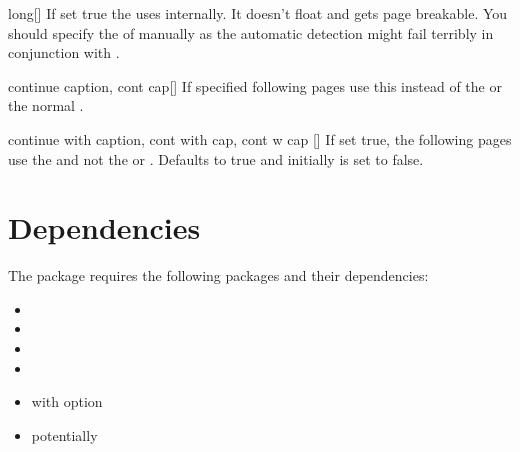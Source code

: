 \begin{describeopt}{long}[]%
  If set true the  uses  internally. It doesn't
  float and gets page breakable. You should specify the  of
   manually as the automatic detection might fail terribly in
  conjunction with .
\end{describeopt}%
\begin{describeopt}{continue caption, cont cap}[]%
  If specified following pages use this  instead of the  or the normal .
\end{describeopt}%
\begin{describeopt}{continue with caption, cont with cap, cont w cap}%
  []
  If set true, the following pages use the  and not the  or . Defaults to true and initially is set to
  false.
\end{describeopt}%

\section{Dependencies}%
The package requires the following packages and their dependencies:
\vspace*{-\multicolsep}%
\begin{multicols}{3}
  \begin{itemize}
    \item {}
    \item {}
    \item {}
    \item {}
    \item {} with option 
    \item potentially 
  \end{itemize}
\end{multicols}
\vspace*{-\multicolsep}%
